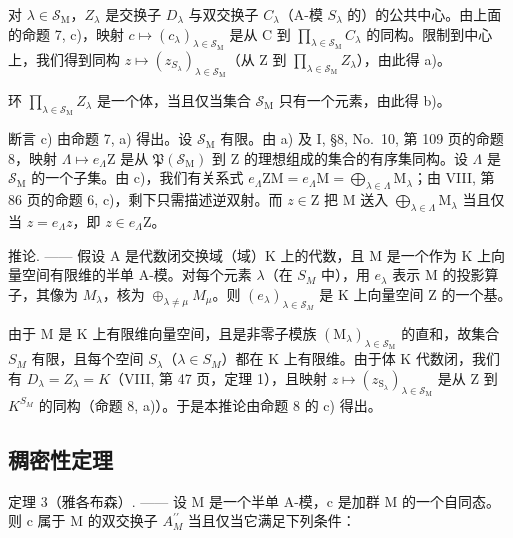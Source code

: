 对 \(\lambda \in \mathcal{S}_{\mathrm{M}}\)，\(Z_{\lambda}\) 是交换子 \(D_{\lambda}\) 与双交换子 \(C_{\lambda}\)（A-模 \(S_{\lambda}\) 的）的公共中心。由上面的命题 7, c)，映射 \(c \mapsto (c_{\lambda})_{\lambda \in \mathcal{S}_{\mathrm{M}}}\) 是从 C 到 \(\prod_{\lambda \in \mathcal{S}_{\mathrm{M}}} C_{\lambda}\) 的同构。限制到中心上，我们得到同构 \(z \mapsto (z_{S_{\lambda}})_{\lambda \in \mathcal{S}_{\mathrm{M}}}\)（从 Z 到 \(\prod_{\lambda \in \mathcal{S}_{\mathrm{M}}} Z_{\lambda}\)），由此得 a)。

环 \(\prod_{\lambda \in \mathcal{S}_{\mathrm{M}}}Z_{\lambda}\) 是一个体，当且仅当集合 \(\mathcal{S}_{\mathrm{M}}\) 只有一个元素，由此得 b)。

断言 c) 由命题 7, a) 得出。设 \(\mathcal{S}_{\mathrm{M}}\) 有限。由 a) 及 I, §8, No.~10, 第 109 页的命题 8，映射 \(\Lambda \mapsto e_{\Lambda}\mathrm{Z}\) 是从 \(\mathfrak{P}(\mathcal{S}_{\mathrm{M}})\) 到 Z 的理想组成的集合的有序集同构。设 \(\Lambda\) 是 \(\mathcal{S}_{\mathrm{M}}\) 的一个子集。由 c)，我们有关系式 \(e_{\Lambda}\mathrm{ZM} = e_{\Lambda}\mathrm{M} = \bigoplus_{\lambda \in \Lambda}\mathrm{M}_{\lambda}\)；由 VIII, 第 86 页的命题 6, c)，剩下只需描述逆双射。而 \(z \in \mathrm{Z}\) 把 M 送入 \(\bigoplus_{\lambda \in \Lambda}\mathrm{M}_{\lambda}\) 当且仅当 \(z = e_{\Lambda}z\)，即 \(z \in e_{\Lambda}\mathrm{Z}\)。

推论. —— 假设 A 是代数闭交换域（域）K 上的代数，且 M 是一个作为 K 上向量空间有限维的半单 A-模。对每个元素 \(\lambda\)（在 \(S_{M}\) 中），用 \(e_{\lambda}\) 表示 M 的投影算子，其像为 \(M_{\lambda}\)，核为 \(\oplus_{\lambda\neq\mu}M_{\mu}\)。则 \((e_{\lambda})_{\lambda\in\mathcal{S}_{M}}\) 是 K 上向量空间 Z 的一个基。

由于 M 是 K 上有限维向量空间，且是非零子模族 \((\mathrm{M}_{\lambda})_{\lambda\in\mathcal{S}_{\mathrm{M}}}\) 的直和，故集合 \(S_{M}\) 有限，且每个空间 \(S_{\lambda}\)（\(\lambda\in S_{M}\)）都在 K 上有限维。由于体 K 代数闭，我们有 \(D_{\lambda}=Z_{\lambda}=K\)（VIII, 第 47 页，定理 1），且映射 \(z\mapsto(z_{\mathrm{S}_{\lambda}})_{\lambda\in\mathcal{S}_{\mathrm{M}}}\) 是从 Z 到 \(K^{S_{M}}\) 的同构（命题 8, a)）。于是本推论由命题 8 的 c) 得出。

\subsection{稠密性定理}

定理 3（雅各布森）. —— 设 M 是一个半单 A-模，c 是加群 M 的一个自同态。则 c 属于 M 的双交换子 \(A_{M}^{\prime\prime}\) 当且仅当它满足下列条件：

